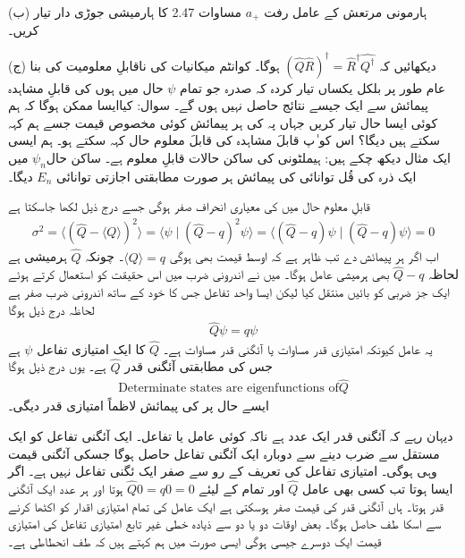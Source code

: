 (ب) ہارمونی مرتعش کے عامل رفت \(a_+\) مساوات \num{2.47} کا ہارمیشی جوڑی دار تیار کریں۔

(ج) دیکھائیں کہ \((\hat{Q}\hat{R})^\dagger = \hat{R}^\dagger \hat{Q^\dagger}\) ہوگا۔
کوانٹم میکانیات کی ناقابلِ معلومیت کی بنا عام طور پر بلکل یکساں تیار کردہ کہ صدرہ جو تمام \(\psi\) حال میں ہوں کی قابلِ مشاہدہ  پیمائش سے ایک جیسے نتائج حاصل نہیں ہوں گے۔ سوال: کیاایسا ممکن ہوگا کہ ہم کوئی ایسا حال تیار کریں جہاں پہ  کی ہر پیمائش کوئی مخصوص قیمت جسے ہم  کہہ سکتے ہیں دیگا؟ اس کو ٰپ قابلَ مشاہدہ  کی قابلَ معلوم حال کہہ سکتے ہو۔ ہم ایسی ایک مثال دیکھ چکے ہیں: ہیملٹونی کی ساکن حالات قابلِ معلوم ہے۔ ساکن حال\(\psi_n\) میں ایک ذرہ کی قُل توانائی کی پیمائش ہر صورت مطابقتی اجازتی توانائی \(E_n\) دیگا۔

قابلِ معلوم حال میں  کی معیاری انحراف صفر ہوگی جسے درج ذیل لکھا جاسکتا ہے
\begin{align}
	\sigma^{2} = \langle (\hat{Q}-\langle Q \rangle)^{2} \rangle = \langle \psi\mid(\hat{Q}-q)^{2}\psi \rangle = \langle (\hat{Q}-q)\psi\mid(\hat{Q}-q)\psi \rangle = 0
\end{align}
اب اگر ہر پیمائش  دے تب ظاہر ہے کہ اوسط قیمت بھی  ہوگی \(\langle Q \rangle = q\)۔ چونکہ \(\hat{Q}\) ہرمیشی ہے لحاظہ \(\hat{Q}-q\) بھی ہرمیشی عامل ہوگا۔ میں نے اندرونی ضرب میں اس حقیقت کو استعمال کرتے ہوئے ایک جز ضربی کو بائیں منتقل کیا لیکن ایسا واحد تفاعل جس کا خود کے ساتھ اندرونی ضرب صفر ہے لحاظہ درج ذیل ہوگا
\begin{align}
	\hat{Q}\psi = q\psi
\end{align}
یہ عامل کیونکہ امتیازی قدر مساوات یا آئگنی قدر مساوات ہے۔ \(\hat{Q}\)  کا ایک امتیازی تفاعل \(\psi\) ہے جس کی مطابقتی آئگنی قدر \(\hat{Q}\) ہے۔ یوں درج ذیل ہوگا
\begin{align}
	\text{Determinate states are eigenfunctions of}\hat{Q}
\end{align}
ایسے حال پر  کی پیمائش لاظماً امتیازی قدر  دیگی۔

دیہان رہے کہ آئگنی قدر ایک عدد ہے ناکہ کوئی عامل یا تفاعل۔ ایک آئگنی تفاعل کو ایک مستقل سے ضرب دینے سے دوبارہ ایک آئگنی تفاعل حاصل ہوگا جسکی آئگنی قیمت وہی ہوگی۔ امتیازی تفاعل کی تعریف کے رو سے صفر ایک ئگنی تفاعل نہیں ہے۔ اگر ایسا ہوتا تب کسی بھی عامل \(\hat{Q}\) اور تمام  کے لیئے \(\hat{Q}0=q0=0\) ہوتا اور ہر عدد ایک آئگنی قدر ہوتا۔ ہاں آئگنی قدر کی قیمت صفر ہوسکتی ہے ایک عامل کی تمام امتیازی اقدار کو اکٹھا کرنے سے اسکا طف حاصل ہوگا۔ بعض اوقات دو یا دو سے ذیادہ خطی غیر تابع امتیازی تفاعل کی امتیازی قیمت ایک دوسرے جیسی ہوگی ایسی صورت میں ہم کہتے ہیں کہ طف انحطاطی ہے۔

